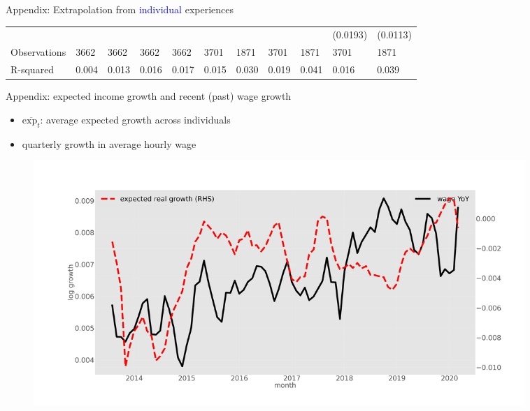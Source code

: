 \documentclass{beamer}
\begin{document}
\begin{frame}{Appendix: Extrapolation from \textcolor{blue}{individual} experiences}
\begin{table}
{\begin{tabular}{lllllllllll}
				&           &           &           &           &            &            &            &            & (0.0193)   & (0.0113)   \\
				Observations                          & 3662      & 3662      & 3662      & 3662      & 3701       & 1871       & 3701       & 1871       & 3701       & 1871       \\
				R-squared                             & 0.004     & 0.013     & 0.016     & 0.017     & 0.015      & 0.030      & 0.019      & 0.041      & 0.016      & 0.039      \\
				\hline 
			\end{tabular}
		}
	\end{table}
\hyperlink{otherresults}{}    
\end{frame}



\begin{frame}{Appendix: expected income growth and recent (past) wage growth}
	\label{appendix:tsMean3mvrexp_he}
	\begin{itemize}
		\item $\overline{\text{exp}_{t}} $: average expected growth across individuals
		\item  quarterly growth in average hourly wage
	\end{itemize}
	\begin{figure}
		\centering
		\label{ts_exp}
		\includegraphics[width=0.9\textwidth]{figures/tsMean3mvrexp_he.jpg}
	\end{figure}
	\quad  \hyperlink{tsMean3mvrvar_he}{} 
\end{frame}
\end{document}

